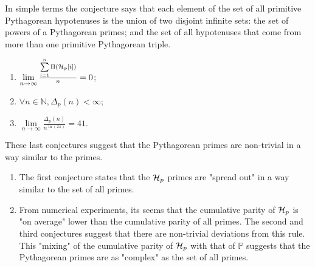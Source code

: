 \documentclass{article}
\theoremstyle{definition}
\begin{document}
In simple terms the conjecture says that each element of the set of all primitive Pythagorean hypotenuses is the union of two disjoint infinite sets:
the set of powers of a Pythagorean primes; and the set of all hypotenuses that come from more than one primitive Pythagorean triple.

\begin{enumerate}
  \item{$\lim\limits_{n \rightarrow \infty} \frac{\sum\limits_{i=1}^n \Pi({\cal H}_p[i])}{n} = 0$;}
  \item{$\forall n\in \mathbb{N}, \Delta_p(n) < \infty$;}
  \item{$ \lim\limits_{n \rightarrow \infty} \frac{\Delta_p(n)}{n^{\ln(2 \pi)}} = 41$.}
\end{enumerate}

These last conjectures suggest that the Pythagorean primes are non-trivial in a way similar to the primes.
\begin{enumerate}
  \item{The first conjecture states that the ${\cal H}_p$ primes are "spread out" in a way similar to the set of all primes.}
  \item{From numerical experiments, its seems that the cumulative parity of ${\cal H}_p$ is "on average" lower than the cumulative parity of all primes.
      The second and third conjectures suggest that there 
      are non-trivial deviations from this rule. This "mixing" of the cumulative parity of ${\cal H}_p$ with that of $\mathbb{P}$ 
      suggests that the Pythagorean primes are as "complex" as the set of all primes.}
\end{enumerate}
\end{document}
